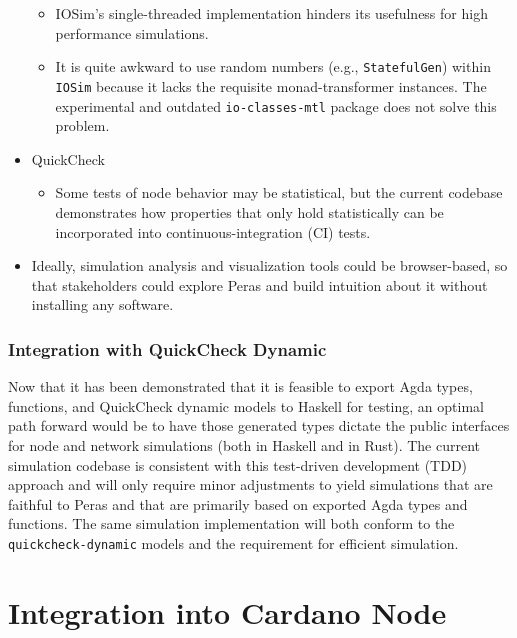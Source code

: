\documentclass[10pt]{article}
\providecommand{\tightlist}{%
  \setlength{\itemsep}{0pt}\setlength{\parskip}{0pt}}
\begin{document}
\begin{itemize}
  \begin{itemize}
  \tightlist
  \item
    IOSim's single-threaded implementation hinders its usefulness for
    high performance simulations.
  \item
    It is quite awkward to use random numbers (e.g.,
    \texttt{StatefulGen}) within \texttt{IOSim} because it lacks the
    requisite monad-transformer instances. The experimental and outdated
    \texttt{io-classes-mtl} package does not solve this problem.
  \end{itemize}
\item
  QuickCheck

  \begin{itemize}
  \tightlist
  \item
    Some tests of node behavior may be statistical, but the current
    codebase demonstrates how properties that only hold statistically
    can be incorporated into continuous-integration (CI) tests.
  \end{itemize}
\item
  Ideally, simulation analysis and visualization tools could be
  browser-based, so that stakeholders could explore Peras and build
  intuition about it without installing any software.
\end{itemize}

\subsubsection{Integration with QuickCheck
Dynamic}\label{integration-with-quickcheck-dynamic}

Now that it has been demonstrated that it is feasible to export Agda
types, functions, and QuickCheck dynamic models to Haskell for testing,
an optimal path forward would be to have those generated types dictate
the public interfaces for node and network simulations (both in Haskell
and in Rust). The current simulation codebase is consistent with this
test-driven development (TDD) approach and will only require minor
adjustments to yield simulations that are faithful to Peras and that are
primarily based on exported Agda types and functions. The same
simulation implementation will both conform to the
\texttt{quickcheck-dynamic} models and the requirement for efficient
simulation.

\section{Integration into Cardano
Node}\label{integration-into-cardano-node}
\end{document}
